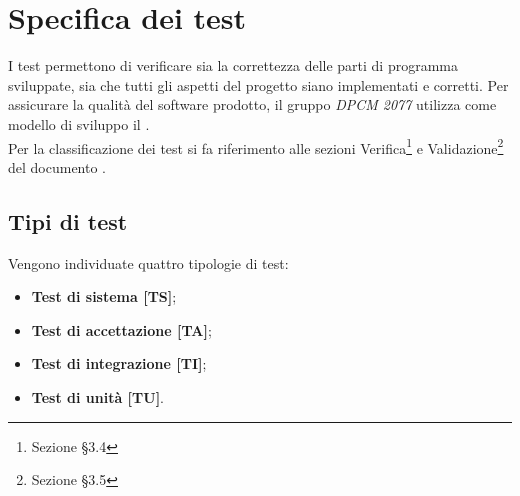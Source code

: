 
\section{Specifica dei test}
I test permettono di verificare sia la correttezza delle parti di programma sviluppate, sia che tutti gli aspetti del progetto siano implementati e corretti.
Per assicurare la qualità del software prodotto, il gruppo \textit{DPCM 2077} utilizza come modello di sviluppo il .
\\
Per la classificazione dei test si fa riferimento alle sezioni Verifica\footnote{Sezione §3.4} e Validazione\footnote{Sezione §3.5} del documento .
	\subsection{Tipi di test}
	Vengono individuate quattro tipologie di test:
	\begin{itemize}
		\item \textbf{Test di sistema [TS]};
		\item \textbf{Test di accettazione [TA]};
		\item \textbf{Test di integrazione [TI]};
		\item \textbf{Test di unità [TU]}.
	\end{itemize}

